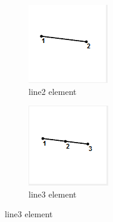 \begin{figure}[ht]
\centering
\begin{subfigure}{.5\textwidth}
  \centering
  \includegraphics[width=0.3\linewidth]{../Graphics/LISA-line2.png}
  \caption{line2 element}
  \label{fig:sub1}
\end{subfigure}%
\begin{subfigure}{.5\textwidth}
  \centering
  \includegraphics[width=0.3\linewidth]{../Graphics/LISA-line3.png}
  \caption{line3 element}
  \label{fig:sub2}
\end{subfigure}
\label{fig:test}
\end{figure} 







